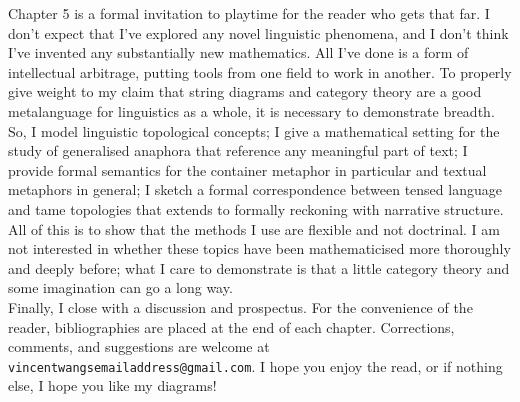 Chapter 5 is a formal invitation to playtime for the reader who gets that far. I don't expect that I've explored any novel linguistic phenomena, and I don't think I've invented any substantially new mathematics. All I've done is a form of intellectual arbitrage, putting tools from one field to work in another. To properly give weight to my claim that string diagrams and category theory are a good metalanguage for linguistics as a whole, it is necessary to demonstrate breadth. So, I model linguistic topological concepts; I give a mathematical setting for the study of generalised anaphora that reference any meaningful part of text; I provide formal semantics for the container metaphor in particular and textual metaphors in general; I sketch a formal correspondence between tensed language and tame topologies that extends to formally reckoning with narrative structure. All of this is to show that the methods I use are flexible and not doctrinal. I am not interested in whether these topics have been mathematicised more thoroughly and deeply before; what I care to demonstrate is that a little category theory and some imagination can go a long way.\\

Finally, I close with a discussion and prospectus. For the convenience of the reader, bibliographies are placed at the end of each chapter. Corrections, comments, and suggestions are welcome at \texttt{vincentwangsemailaddress@gmail.com}. I hope you enjoy the read, or if nothing else, I hope you like my diagrams!
